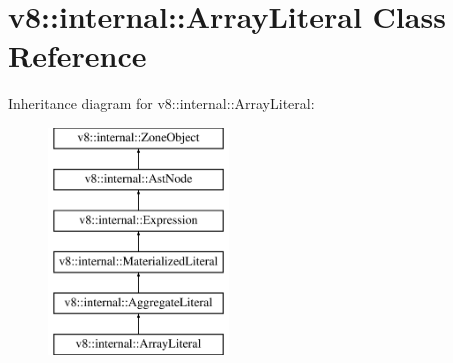 \hypertarget{classv8_1_1internal_1_1ArrayLiteral}{}\section{v8\+:\+:internal\+:\+:Array\+Literal Class Reference}
\label{classv8_1_1internal_1_1ArrayLiteral}
Inheritance diagram for v8\+:\+:internal\+:\+:Array\+Literal\+:\begin{figure}[H]
\begin{center}
\leavevmode
\includegraphics[height=6.000000cm]{classv8_1_1internal_1_1ArrayLiteral}
\end{center}
\end{figure}
